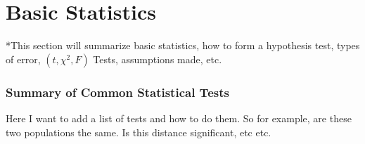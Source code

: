 \section{Basic Statistics}
*This section will summarize basic statistics, how to form a hypothesis test, types of error, $(t,\chi^2,F)$ Tests, assumptions made, etc.

\subsubsection{Summary of Common Statistical Tests}
Here I want to add a list of tests and how to do them.  So for example, are these two populations the same.  Is this distance significant, etc etc.